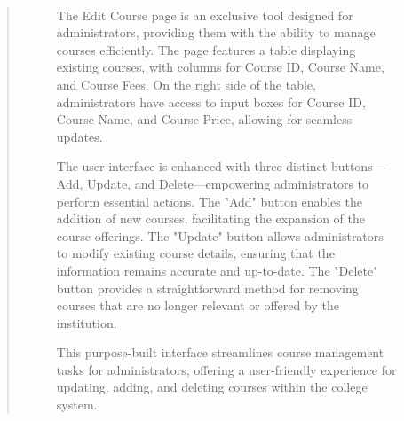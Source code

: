 \documentclass[12pt]{report}
\begin{document}
\begin{quote}
\begin{figure}[h]
			\paragraph{}
			\justifying
			The Edit Course page is an exclusive tool designed for administrators, providing them with the ability to manage courses efficiently. The page features a table displaying existing courses, with columns for Course ID, Course Name, and Course Fees. On the right side of the table, administrators have access to input boxes for Course ID, Course Name, and Course Price, allowing for seamless updates.
			
			The user interface is enhanced with three distinct buttons—Add, Update, and Delete—empowering administrators to perform essential actions. The "Add" button enables the addition of new courses, facilitating the expansion of the course offerings. The "Update" button allows administrators to modify existing course details, ensuring that the information remains accurate and up-to-date. The "Delete" button provides a straightforward method for removing courses that are no longer relevant or offered by the institution.
			
			This purpose-built interface streamlines course management tasks for administrators, offering a user-friendly experience for updating, adding, and deleting courses within the college system.
			\end{figure}
	\end{quote}
	\clearpage
	
	

	\clearpage
	
\end{document}
